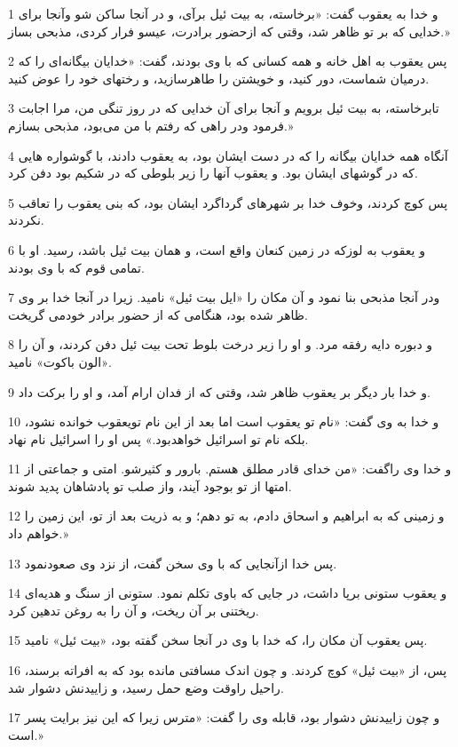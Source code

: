 \par 1 و خدا به یعقوب گفت: «برخاسته، به بیت ئیل برآی، و در آنجا ساکن شو وآنجا برای خدایی که بر تو ظاهر شد، وقتی که ازحضور برادرت، عیسو فرار کردی، مذبحی بساز.»
\par 2 پس یعقوب به اهل خانه و همه کسانی که با وی بودند، گفت: «خدایان بیگانه‌ای را که درمیان شماست، دور کنید، و خویشتن را طاهرسازید، و رختهای خود را عوض کنید.
\par 3 تابرخاسته، به بیت ئیل برویم و آنجا برای آن خدایی که در روز تنگی من، مرا اجابت فرمود ودر راهی که رفتم با من می‌بود، مذبحی بسازم.»
\par 4 آنگاه همه خدایان بیگانه را که در دست ایشان بود، به یعقوب دادند، با گوشواره هایی که در گوشهای ایشان بود. و یعقوب آنها را زیر بلوطی که در شکیم بود دفن کرد.
\par 5 پس کوچ کردند، وخوف خدا بر شهرهای گرداگرد ایشان بود، که بنی یعقوب را تعاقب نکردند.
\par 6 و یعقوب به لوزکه در زمین کنعان واقع است، و همان بیت ئیل باشد، رسید. او با تمامی قوم که با وی بودند.
\par 7 ودر آنجا مذبحی بنا نمود و آن مکان را «ایل بیت ئیل» نامید. زیرا در آنجا خدا بر وی ظاهر شده بود، هنگامی که از حضور برادر خودمی گریخت.
\par 8 و دبوره دایه رفقه مرد. و او را زیر درخت بلوط تحت بیت ئیل دفن کردند، و آن را «الون باکوت» نامید.
\par 9 و خدا بار دیگر بر یعقوب ظاهر شد، وقتی که از فدان ارام آمد، و او را برکت داد.
\par 10 و خدا به وی گفت: «نام تو یعقوب است اما بعد از این نام تویعقوب خوانده نشود، بلکه نام تو اسرائیل خواهدبود.» پس او را اسرائیل نام نهاد.
\par 11 و خدا وی راگفت: «من خدای قادر مطلق هستم. بارور و کثیرشو. امتی و جماعتی از امتها از تو بوجود آیند، واز صلب تو پادشاهان پدید شوند.
\par 12 و زمینی که به ابراهیم و اسحاق دادم، به تو دهم؛ و به ذریت بعد از تو، این زمین را خواهم داد.» 
\par 13 پس خدا ازآنجایی که با وی سخن گفت، از نزد وی صعودنمود.
\par 14 و یعقوب ستونی برپا داشت، در جایی که باوی تکلم نمود. ستونی از سنگ و هدیه‌ای ریختنی بر آن ریخت، و آن را به روغن تدهین کرد.
\par 15 پس یعقوب آن مکان را، که خدا با وی در آنجا سخن گفته بود، «بیت ئیل» نامید.
\par 16 پس، از «بیت ئیل» کوچ کردند. و چون اندک مسافتی مانده بود که به افراته برسند، راحیل راوقت وضع حمل رسید، و زاییدنش دشوار شد.
\par 17 و چون زاییدنش دشوار بود، قابله وی را گفت: «مترس زیرا که این نیز برایت پسر است.»
